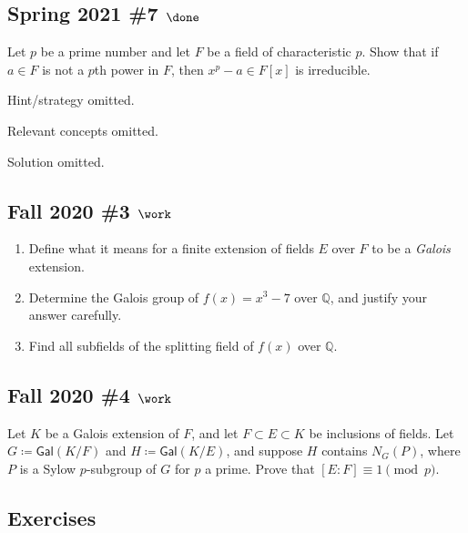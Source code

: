 \hypertarget{spring-2021-7-done}{%
\subsection{\texorpdfstring{Spring 2021 \#7
\(\done\)}{Spring 2021 \#7 \textbackslash done}}\label{spring-2021-7-done}}

Let \(p\) be a prime number and let \(F\) be a field of characteristic
\(p\). Show that if \(a\in F\) is not a \(p\)th power in \(F\), then
\(x^p-a \in F[x]\) is irreducible.

Hint/strategy omitted.

Relevant concepts omitted.

Solution omitted.

\hypertarget{fall-2020-3-work}{%
\subsection{\texorpdfstring{Fall 2020 \#3
\(\work\)}{Fall 2020 \#3 \textbackslash work}}\label{fall-2020-3-work}}

\begin{enumerate}
\def\labelenumi{\alph{enumi}.}
\item
  Define what it means for a finite extension of fields \(E\) over \(F\)
  to be a \emph{Galois} extension.
\item
  Determine the Galois group of \(f(x) = x^3 - 7\) over
  \({\mathbb{Q}}\), and justify your answer carefully.
\item
  Find all subfields of the splitting field of \(f(x)\) over
  \({\mathbb{Q}}\).
\end{enumerate}

\hypertarget{fall-2020-4-work}{%
\subsection{\texorpdfstring{Fall 2020 \#4
\(\work\)}{Fall 2020 \#4 \textbackslash work}}\label{fall-2020-4-work}}

Let \(K\) be a Galois extension of \(F\), and let
\(F \subset E \subset K\) be inclusions of fields. Let
\(G \coloneqq{ \mathsf{Gal}} (K/F)\) and
\(H \coloneqq{ \mathsf{Gal}} (K/E)\), and suppose \(H\) contains
\(N_G(P)\), where \(P\) is a Sylow \(p\)-subgroup of \(G\) for \(p\) a
prime. Prove that \([E: F] \equiv 1 \pmod p\).

\hypertarget{exercises}{%
\subsection{Exercises}\label{exercises}}

